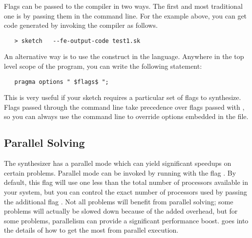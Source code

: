 

Flags can be passed to the compiler in two ways. The first and most traditional one is by passing them in the command line. For the example above, you can get code generated by invoking the compiler as follows.
\begin{lstlisting}
   > sketch   --fe-output-code test1.sk
\end{lstlisting}

An alternative way is to use the  construct in the language. Anywhere in the top level scope of the program, you can write the following statement:
\begin{lstlisting}
   pragma options " $flags$ ";
\end{lstlisting}
This is very useful if your sketch requires a particular set of flags to synthesize. Flags passed through the command line take precedence over flags passed with , so you can always use the command line to override options embedded in the file.


\subsection{Parallel Solving}
The \Sk{} synthesizer has a parallel mode which can yield significant speedups on certain problems. Parallel mode can be invoked by running with the flag . By default, this flag will use one less than the total number of processors available in your system, but you can control the exact number of processors used by passing the additional flag . Not all problems will benefit from parallel solving; some problems will actually be slowed down because of the added overhead, but for some problems, parallelism can provide a significant performance boost.  goes into the details of how to get the most from parallel execution.



